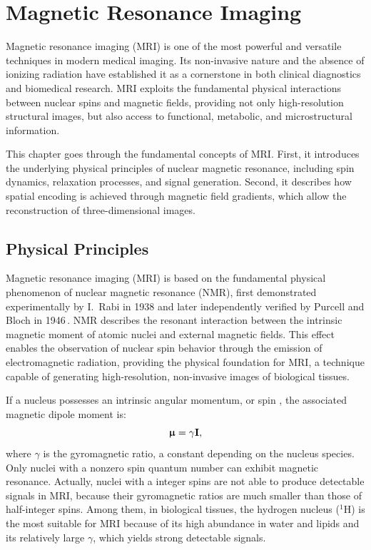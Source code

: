 \chapter{Magnetic Resonance Imaging} \label{chap:MagneticResonanceImaging}
\vspace{1cm}

Magnetic resonance imaging (MRI) is one of the most powerful and versatile techniques in modern medical imaging. Its non-invasive nature and the absence of ionizing radiation have established it as a cornerstone in both clinical diagnostics and biomedical research. MRI exploits the fundamental physical interactions between nuclear spins and magnetic fields, providing not only high-resolution structural images, but also access to functional, metabolic, and microstructural information.

This chapter goes through the fundamental concepts of MRI. First, it introduces the underlying physical principles of nuclear magnetic resonance, including spin dynamics, relaxation processes, and signal generation. Second, it describes how spatial encoding is achieved through magnetic field gradients, which allow the reconstruction of three-dimensional images.

\section{Physical Principles}
Magnetic resonance imaging (MRI) is based on the fundamental physical phenomenon of nuclear magnetic resonance (NMR), first demonstrated experimentally by I.\ Rabi in 1938 and later independently verified by Purcell and Bloch in 1946\,\cite{NMR}. NMR describes the resonant interaction between the intrinsic magnetic moment of atomic nuclei and external magnetic fields. This effect enables the observation of nuclear spin behavior through the emission of electromagnetic radiation, providing the physical foundation for MRI, a technique capable of generating high-resolution, non-invasive images of biological tissues.

If a nucleus possesses an intrinsic angular momentum, or spin , the associated magnetic dipole moment is:
\begin{equation}
    \bm{\upmu} = \gamma \mathbf{I},
\end{equation}
where $\gamma$ is the gyromagnetic ratio, a constant depending on the nucleus species. Only nuclei with a nonzero spin quantum number can exhibit magnetic resonance. Actually, nuclei with a integer spins are not able to produce detectable signals in MRI, because their gyromagnetic ratios are much smaller than those of half-integer spins. Among them, in biological tissues, the hydrogen nucleus ($^1$H) is the most suitable for MRI because of its high abundance in water and lipids and its relatively large $\gamma$, which yields strong detectable signals.

